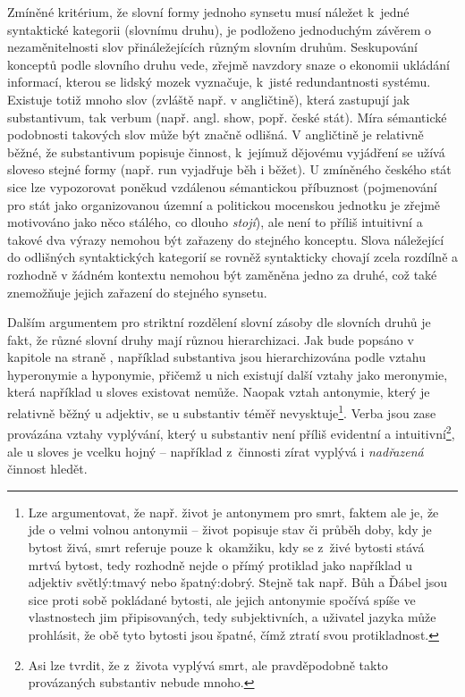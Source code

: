\documentclass[a4paper, 11pt, oneside, showtrims]{book}
\newcommand{\itNameRef}[1]{\textit{\nameref{#1}}}
\newcommand\ex{\textsf}
\begin{document}
					Zmíněné kritérium, že slovní formy jednoho synsetu musí náležet k~jedné syntaktické kategorii (slovnímu druhu), je podloženo jednoduchým závěrem o nezaměnitelnosti slov přináležejících různým slovním druhům. %
					Seskupování konceptů podle slovního druhu vede, zřejmě navzdory snaze o ekonomii ukládání informací, kterou se lidský mozek vyznačuje, k~jisté redundantnosti systému. Existuje totiž mnoho slov (zvláště např. v angličtině), která zastupují jak substantivum, tak verbum (např. angl. \ex{show}, popř. české \ex{stát}). Míra sémantické podobnosti takových slov může být značně odlišná. V angličtině je relativně běžné, že substantivum popisuje činnost, k~jejímuž dějovému vyjádření se užívá sloveso stejné formy (např. \ex{run} vyjadřuje \ex{běh} i \ex{běžet}). U zmíněného českého \ex{stát} sice lze vypozorovat poněkud vzdálenou sémantickou příbuznost (pojmenování pro stát jako organizovanou územní a politickou mocenskou jednotku \parencite{Dorling2003oxforddic} je zřejmě motivováno jako něco stálého, co dlouho \textit{stojí}), ale není to příliš intuitivní a takové dva výrazy nemohou být zařazeny do stejného konceptu. Slova náležející do odlišných syntaktických kategorií se rovněž syntakticky chovají zcela rozdílně a rozhodně v žádném kontextu nemohou být zaměněna jedno za druhé, což také znemožňuje jejich zařazení do stejného synsetu. \parencite{miller1990introduction} 

					Dalším argumentem pro striktní rozdělení slovní zásoby dle slovních druhů je fakt, že různé slovní druhy mají různou hierarchizaci. Jak bude popsáno v kapitole \itNameRef{cha:sem-vztahy} na straně \pageref{cha:sem-vztahy}, například substantiva jsou hierarchizována podle vztahu hyperonymie a hyponymie, přičemž u nich existují další vztahy jako meronymie, která například u sloves existovat nemůže. Naopak vztah antonymie, který je relativně běžný u adjektiv, se u substantiv téměř nevysktuje\footnote{Lze argumentovat, že např. \ex{život} je antonymem pro \ex{smrt}, faktem ale je, že jde o velmi volnou antonymii -- život popisuje stav či průběh doby, kdy je bytost živá, smrt referuje pouze k~okamžiku, kdy se z~živé bytosti stává mrtvá bytost, tedy rozhodně nejde o přímý protiklad jako například u adjektiv \ex{světlý:tmavý} nebo \ex{špatný:dobrý}. Stejně tak např. \ex{Bůh} a \ex{Ďábel} jsou sice proti sobě pokládané bytosti, ale jejich antonymie spočívá spíše ve vlastnostech jim připisovaných, tedy subjektivních, a uživatel jazyka může prohlásit, že obě tyto bytosti jsou špatné, čímž ztratí svou protikladnost.}. Verba jsou zase provázána vztahy vyplývání, který u substantiv není příliš evidentní a intuitivní\footnote{Asi lze tvrdit, že z~\ex{života} vyplývá \ex{smrt}, ale pravděpodobně takto provázaných substantiv nebude mnoho.}, ale u sloves je vcelku hojný -- například z~činnosti \ex{zírat} vyplývá i \textit{nadřazená} činnost \ex{hledět}.
\end{document}
